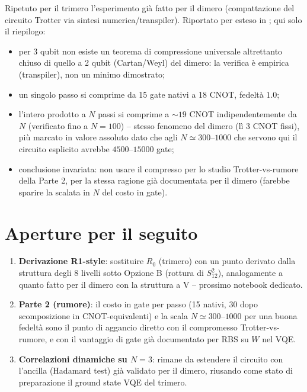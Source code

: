 \documentclass[11pt,a4paper]{article}
\begin{document}
Ripetuto per il trimero l'esperimento già fatto per il dimero
(compattazione del circuito Trotter via sintesi numerica/transpiler).
Riportato per esteso in \texttt{};
qui solo il riepilogo:

\begin{itemize}
\item per 3 qubit non esiste un teorema di compressione universale
altrettanto chiuso di quello a 2 qubit (Cartan/Weyl) del dimero: la
verifica è empirica (transpiler), non un minimo dimostrato;
\item un singolo passo si comprime da 15 gate nativi a 18 CNOT, fedeltà
$1.0$;
\item l'intero prodotto a $N$ passi si comprime a $\sim19$ CNOT
indipendentemente da $N$ (verificato fino a $N=100$) -- stesso fenomeno
del dimero (lì 3 CNOT fissi), più marcato in valore assoluto dato che agli
$N\simeq300$--$1000$ che servono qui il circuito esplicito avrebbe
$4500$--$15000$ gate;
\item conclusione invariata: non usare il compresso per lo studio
Trotter-vs-rumore della Parte 2, per la stessa ragione già documentata
per il dimero (farebbe sparire la scalata in $N$ del costo in gate).
\end{itemize}

\section{Aperture per il seguito}

\begin{enumerate}
\item \textbf{Derivazione R1-style}: sostituire $R_0$ (trimero) con un
punto derivato dalla struttura degli 8 livelli sotto Opzione B (rottura di
$S_{12}^2$), analogamente a quanto fatto per il dimero con la struttura a
V -- prossimo notebook dedicato.
\item \textbf{Parte 2 (rumore)}: il costo in gate per passo (15 nativi,
30 dopo scomposizione in CNOT-equivalenti) e la scala $N\simeq300$--$1000$
per una buona fedeltà sono il punto di aggancio diretto con il compromesso
Trotter-vs-rumore, e con il vantaggio di gate già documentato per RBS su
$W$ nel VQE.
\item \textbf{Correlazioni dinamiche su $N=3$}: rimane da estendere il
circuito con l'ancilla (Hadamard test) già validato per il dimero,
riusando come stato di preparazione il ground state VQE del trimero.
\end{enumerate}
\end{document}
